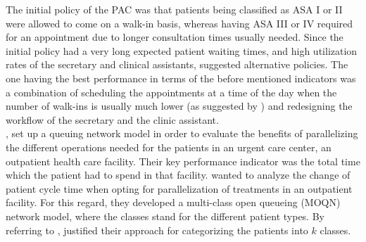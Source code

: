 \documentclass[11pt,a4paper]{article}
\begin{document}
\begin{spacing}{1.8}
The initial policy of the PAC was that patients being classified as ASA I or II were allowed to come on a walk-in basis, whereas having ASA III or IV required for an appointment due to longer consultation times usually needed.
Since the initial policy had a very long expected patient waiting times, and high utilization rates of the secretary and clinical assistants, 
\citet{Zonderland2009} suggested alternative policies. The one having the best performance in terms of the before mentioned indicators was a combination of scheduling the appointments at a time of the day when the number of walk-ins is usually much lower (as suggested by \citep{Rising1973}) and redesigning the workflow of the secretary and the clinic assistant. \\
 \citet{Jiang2007},  set up a queuing network model in order to evaluate the benefits of parallelizing the different operations needed for the patients in an urgent care center, an outpatient health care facility. 
 Their key performance indicator was the total time which the patient had to spend in  that facility. \citet{Jiang2007} wanted to analyze the change of patient cycle time when opting for parallelization of treatments in an outpatient facility. For this regard, they developed a multi-class open queueing (MOQN)  network model, where the classes stand for the different patient types.
By referring to \citep{Harper2002}, \citet{Jiang2007} justified their approach for categorizing the patients into \(k\) classes. 


\end{spacing}
\end{document}
